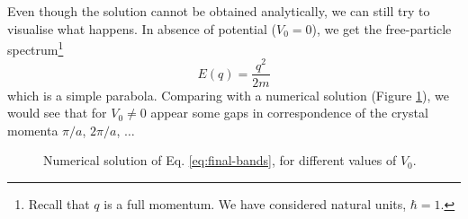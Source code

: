 \noindent Even though the solution cannot be obtained analytically, we can still try to visualise what happens. In absence of potential ($V_0 = 0$), we get the free-particle spectrum\footnote{
    Recall that $q$ is a full momentum. We have considered natural units, $\hbar = 1$.}
$$E(q) = \frac{q^2}{2m}$$
which is a simple parabola. Comparing with a numerical solution (Figure \ref{fig:numerical-bands}), we would see that for $V_0 \neq 0$ appear some gaps in correspondence of the crystal momenta $\pi/a$, $2\pi/a$, $\dots$

\begin{figure}[H]
  \centering
  \hfill
  \caption{\label{fig:numerical-bands} 
Numerical solution of Eq. \ref{eq:final-bands}, for different values of $V_0$. 
}
\end{figure}
